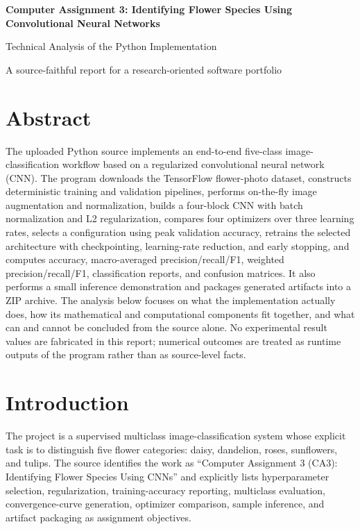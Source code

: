 \documentclass[11pt,a4paper]{article}
\begin{document}
\begin{titlepage}
\centering
\vspace*{1.8cm}
{\Huge\bfseries Computer Assignment 3: Identifying Flower Species Using Convolutional Neural Networks\par}
\vspace{0.5cm}
{\Large Technical Analysis of the Python Implementation\par}
\vfill
{\large A source-faithful report for a research-oriented software portfolio\par}
\vspace*{1.6cm}
\end{titlepage}

\tableofcontents
\newpage

\section*{Abstract}
The uploaded Python source implements an end-to-end five-class image-classification workflow based on a regularized convolutional neural network (CNN). The program downloads the TensorFlow flower-photo dataset, constructs deterministic training and validation pipelines, performs on-the-fly image augmentation and normalization, builds a four-block CNN with batch normalization and L2 regularization, compares four optimizers over three learning rates, selects a configuration using peak validation accuracy, retrains the selected architecture with checkpointing, learning-rate reduction, and early stopping, and computes accuracy, macro-averaged precision/recall/F1, weighted precision/recall/F1, classification reports, and confusion matrices. It also performs a small inference demonstration and packages generated artifacts into a ZIP archive. The analysis below focuses on what the implementation actually does, how its mathematical and computational components fit together, and what can and cannot be concluded from the source alone. No experimental result values are fabricated in this report; numerical outcomes are treated as runtime outputs of the program rather than as source-level facts.

\section{Introduction}
The project is a supervised multiclass image-classification system whose explicit task is to distinguish five flower categories: daisy, dandelion, roses, sunflowers, and tulips. The source identifies the work as ``Computer Assignment 3 (CA3): Identifying Flower Species Using CNNs'' and explicitly lists hyperparameter selection, regularization, training-accuracy reporting, multiclass evaluation, convergence-curve generation, optimizer comparison, sample inference, and artifact packaging as assignment objectives.
\end{document}
